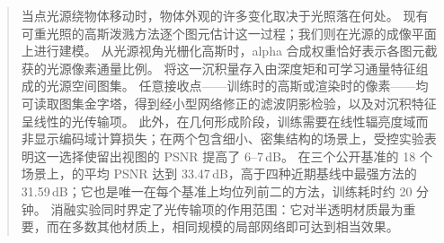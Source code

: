 \begin{abstract}
当点光源绕物体移动时，物体外观的许多变化取决于光照落在何处。
现有可重光照的高斯泼溅方法逐个图元估计这一过程；我们则在光源的成像平面上进行建模。
从光源视角光栅化高斯时，alpha 合成权重恰好表示各图元截获的光源像素通量比例。
\ours 将这一沉积量存入由深度矩和可学习通量特征组成的光源空间图集。
任意接收点——训练时的高斯或渲染时的像素——均可读取图集金字塔，得到经小型网络修正的滤波阴影检验，以及对沉积特征呈线性的光传输项。
此外，在几何形成阶段，训练需要在线性辐亮度域而非显示编码域计算损失；在两个包含细小、密集结构的场景上，受控实验表明这一选择使留出视图的 PSNR 提高了 6--7\,dB。
在三个公开基准的 18 个场景上，\ours 的平均 PSNR 达到 33.47\,dB，高于四种近期基线中最强方法的 31.59\,dB；它也是唯一在每个基准上均位列前二的方法，训练耗时约 20 分钟。
消融实验同时界定了光传输项的作用范围：它对半透明材质最为重要，而在多数其他材质上，相同规模的局部网络即可达到相当效果。
\end{abstract}
